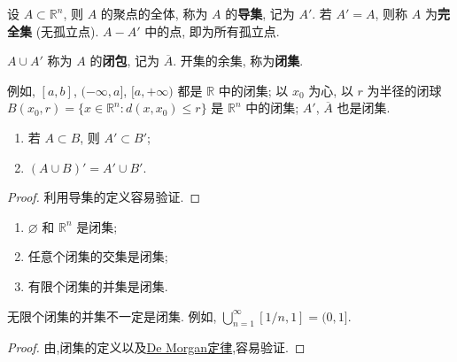 \documentclass[../../main.tex]{subfiles}
\begin{document}
\begin{definition}
设 $A \subset \mathbb{R}^n$, 则 $A$ 的聚点的全体, 称为 $A$ 的\textbf{导集}, 记为 $A'$. 若 $A' = A$, 则称 $A$ 为\textbf{完全集} (无孤立点).
$A - A'$ 中的点, 即为所有孤立点.

$A \cup A'$ 称为 $A$ 的\textbf{闭包}, 记为 $\overline{A}$.
开集的余集, 称为\textbf{闭集}.
\end{definition}
\begin{note}
例如, $[a, b]$, $(-\infty, a]$, $[a, +\infty)$ 都是 $\mathbb{R}$ 中的闭集; 以 $x_0$ 为心, 以 $r$ 为半径的闭球 $B(x_0, r) = \{x \in \mathbb{R}^n : d(x, x_0) \leqslant r\}$ 是 $\mathbb{R}^n$ 中的闭集; $A'$, $\overline{A}$ 也是闭集.
\end{note}

\begin{proposition}
\begin{enumerate}[(1)]
\item 若 $A \subset B$, 则 $A' \subset B'$;
\item $(A \cup B)' = A' \cup B'$.
\end{enumerate}
\end{proposition}
\begin{proof}
利用导集的定义容易验证.
\end{proof}

\begin{proposition}[闭集的性质]\label{proposition:闭集的性质}
\begin{enumerate}[(1)]
\item $\varnothing$ 和 $\mathbb{R}^n$ 是闭集;
\item 任意个闭集的交集是闭集;
\item 有限个闭集的并集是闭集.
\end{enumerate}
\end{proposition}
\begin{remark}
无限个闭集的并集不一定是闭集. 例如, $\bigcup_{n = 1}^{\infty} [1/n, 1] = (0, 1]$.
\end{remark}
\begin{proof}
由,闭集的定义以及\hyperref[Set Theory-theorem:De Morgan定律]{De Morgan定律},容易验证.
\end{proof}
\end{document}
